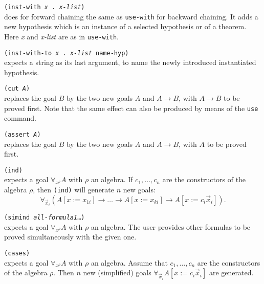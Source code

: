 \documentclass[12pt]{amsart}
\newcommand{\subst}[3]{#1[#2:= #3]}
\begin{document}
\begin{appendix}
\texttt{(inst-with \textsl{x} . \textsl{x-list})}%
\\
does for forward chaining the same as \texttt{use-with} for backward
chaining.  It adds a new hypothesis which is an instance of a selected
hypothesis or of a theorem.
Here \textsl{x} and \textsl{x-list} are as in \texttt{use-with}.

\texttt{(inst-with-to \textsl{x} . \textsl{x-list} \texttt{name-hyp})}
\\
expects a string as its last argument, to name
the newly introduced instantiated hypothesis.

\texttt{(cut \textsl{A})}\\
replaces the goal $B$ by the two new goals $A$ and $A \to B$, with $A
\to B$ to be proved first.  Note that the same effect can also be
produced by means of the \texttt{use} command.

\texttt{(assert \textsl{A})}\\
replaces the goal $B$ by the two new goals $A$ and $A \to B$,
with $A$ to be proved first.

\texttt{(ind)}\\
expects a goal $\forall_{x^\rho} A$ with $\rho$ an algebra.  If $c_1,
\dots, c_n$ are the constructors of the algebra $\rho$, then
\texttt{(ind)} will generate $n$ new goals:
\begin{equation*}
  \forall_{\vec{x}_i} (\subst{A}{x}{x_{1i}} \to \dots \to
  \subst{A}{x}{x_{ki}} \to \subst{A}{x}{c_i \vec{x}_i}).
\end{equation*}

\texttt{(simind \textsl{all-formula1}\dots)}%
\\
expects a goal $\forall_{x^\rho} A$ with $\rho$ an algebra.  The user
provides other formulas to be proved simultaneously with the given
one.

\texttt{(cases)}\\
expects a goal $\forall_{x^\rho} A$ with $\rho$ an algebra.  Assume
that $c_1,\dots, c_n$ are the constructors of the algebra $\rho$.
Then $n$ new (simplified) goals $\forall_{\vec{x}_i} \subst{A}{x}{c_i
  \vec{x}_i}$ are
generated.


\end{appendix}
\end{document}
